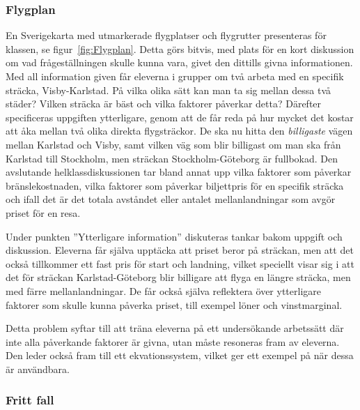     

\subsubsection{Flygplan}
    \label{sec:Flygplan}
    
    \textcolor{lila}{En Sverigekarta med utmarkerade flygplatser och flygrutter presenteras för klassen, se figur~\ref{fig:Flygplan}. Detta görs bitvis, med plats för en kort diskussion om vad frågeställningen skulle kunna vara, givet den dittills givna informationen. Med all information given får eleverna i grupper om två arbeta med en specifik sträcka, Visby-Karlstad. På vilka olika sätt kan man ta sig mellan dessa två städer? Vilken sträcka är bäst och vilka faktorer påverkar detta? Därefter specificeras uppgiften ytterligare, genom att de får reda på hur mycket det kostar att åka mellan två olika direkta flygsträckor. De ska nu hitta den \textsl{billigaste} vägen mellan Karlstad och Visby, samt vilken väg som blir billigast om man ska från Karlstad till Stockholm, men sträckan Stockholm-Göteborg är fullbokad. Den avslutande helklassdiskussionen tar bland annat upp vilka faktorer som påverkar bränslekostnaden, vilka faktorer som påverkar biljettpris för en specifik sträcka och ifall det är det totala avståndet eller antalet mellanlandningar som avgör priset för en resa.}
    
    \textcolor{lila}{Under punkten ''Ytterligare information'' diskuteras tankar bakom uppgift och diskussion. Eleverna får själva upptäcka att priset beror på sträckan, men att det också tillkommer ett fast pris för start och landning, vilket speciellt visar sig i att det för sträckan Karlstad-Göteborg blir billigare att flyga en längre sträcka, men med färre mellanlandningar. De får också själva reflektera över ytterligare faktorer som skulle kunna påverka priset, till exempel löner och vinstmarginal.}
    
    \textcolor{lila}{Detta  problem syftar till att träna eleverna på ett undersökande arbetssätt där inte alla påverkande faktorer är givna, utan måste resoneras fram av eleverna. Den leder också fram till ett ekvationssystem, vilket ger ett exempel på när dessa är användbara.}
    
    
    
\subsubsection{Fritt fall}
    \label{sec:FrittFall}
    
